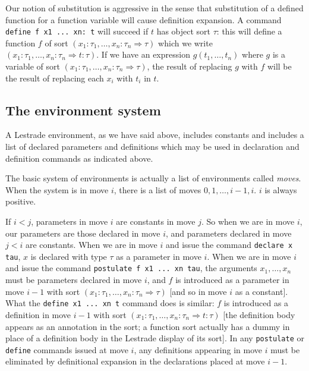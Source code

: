 \documentclass[12pt]{article}
\begin{document}
Our notion of substitution is aggressive in the sense that substitution of a defined function for a function variable will cause definition expansion.  A command {\tt define f x1 ... xn: t}  will succeed if
$t$ has object sort $\tau$:  this will define a function $f$ of sort $(x_1:\tau_1,\ldots,x_n:\tau_n \Rightarrow \tau)$ which we write $(x_1:\tau_1,\ldots,x_n:\tau_n \Rightarrow t:\tau)$.  If we have an expression
$g(t_1,\ldots,t_n)$ where $g$ is a variable of sort $(x_1:\tau_1,\ldots,x_n:\tau_n \Rightarrow \tau)$, the result of replacing $g$ with $f$ will be the result of replacing each $x_i$ with $t_i$ in $t$.

\subsection{The environment system}

A Lestrade environment, as we have said above, includes constants and includes a list of declared parameters and definitions which may be used in declaration and definition commands as indicated above.

The basic system of environments is actually a list of environments called {\em moves\/}.   When the system is in move $i$, there is a list of moves $0,1,\ldots,i-1,i$.   $i$ is always positive.

If $i<j$, parameters in move $i$ are constants in move $j$.  So when we are in move $i$, our parameters are those declared in move $i$, and parameters declared in move $j<i$ are constants.  When we are in move $i$ and issue the command
{\tt declare x tau}, $x$ is declared with type $\tau$ as a parameter in move $i$.  When we are in move $i$ and issue the command {\tt postulate f x1 ... xn tau}, the arguments $x_1,\ldots,x_n$ must be parameters declared in move $i$, and $f$ is introduced as a parameter in move $i-1$
with sort $(x_1:\tau_1,\ldots,x_n:\tau_n \Rightarrow \tau)$ [and so in move $i$ as a constant].  What the {\tt define x1 ... xn t} command does is similar:  $f$ is introduced as a definition in move $i-1$ with sort
$(x_1:\tau_1,\ldots,x_n:\tau_n \Rightarrow t:\tau)$ [the definition body appears as an annotation in the sort;  a function sort actually has a dummy in place of a definition body in the Lestrade display of its sort].  In any {\tt postulate} or {\tt define} commands issued at move $i$, any definitions appearing in move $i$ must be eliminated by definitional expansion in the declarations placed at move $i-1$. 
\end{document}
